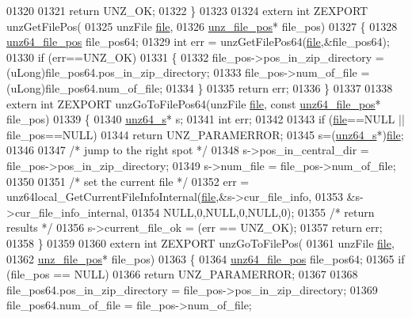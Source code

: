 \begin{DoxyCode}
01320 
01321     \textcolor{keywordflow}{return} UNZ\_OK;
01322 \}
01323 
01324 \textcolor{keyword}{extern} \textcolor{keywordtype}{int} ZEXPORT unzGetFilePos(
01325     unzFile \hyperlink{structfile}{file},
01326     \hyperlink{structunz__file__pos__s}{unz\_file\_pos}* file\_pos)
01327 \{
01328     \hyperlink{structunz64__file__pos__s}{unz64\_file\_pos} file\_pos64;
01329     \textcolor{keywordtype}{int} err = unzGetFilePos64(\hyperlink{structfile}{file},&file\_pos64);
01330     \textcolor{keywordflow}{if} (err==UNZ\_OK)
01331     \{
01332         file\_pos->pos\_in\_zip\_directory = (uLong)file\_pos64.pos\_in\_zip\_directory;
01333         file\_pos->num\_of\_file = (uLong)file\_pos64.num\_of\_file;
01334     \}
01335     \textcolor{keywordflow}{return} err;
01336 \}
01337 
01338 \textcolor{keyword}{extern} \textcolor{keywordtype}{int} ZEXPORT unzGoToFilePos64(unzFile \hyperlink{structfile}{file}, \textcolor{keyword}{const} \hyperlink{structunz64__file__pos__s}{unz64\_file\_pos}* file\_pos)
01339 \{
01340     \hyperlink{structunz64__s}{unz64\_s}* s;
01341     \textcolor{keywordtype}{int} err;
01342 
01343     \textcolor{keywordflow}{if} (\hyperlink{structfile}{file}==NULL || file\_pos==NULL)
01344         \textcolor{keywordflow}{return} UNZ\_PARAMERROR;
01345     s=(\hyperlink{structunz64__s}{unz64\_s}*)\hyperlink{structfile}{file};
01346 
01347     \textcolor{comment}{/* jump to the right spot */}
01348     s->pos\_in\_central\_dir = file\_pos->pos\_in\_zip\_directory;
01349     s->num\_file           = file\_pos->num\_of\_file;
01350 
01351     \textcolor{comment}{/* set the current file */}
01352     err = unz64local\_GetCurrentFileInfoInternal(\hyperlink{structfile}{file},&s->cur\_file\_info,
01353                                                &s->cur\_file\_info\_internal,
01354                                                NULL,0,NULL,0,NULL,0);
01355     \textcolor{comment}{/* return results */}
01356     s->current\_file\_ok = (err == UNZ\_OK);
01357     \textcolor{keywordflow}{return} err;
01358 \}
01359 
01360 \textcolor{keyword}{extern} \textcolor{keywordtype}{int} ZEXPORT unzGoToFilePos(
01361     unzFile \hyperlink{structfile}{file},
01362     \hyperlink{structunz__file__pos__s}{unz\_file\_pos}* file\_pos)
01363 \{
01364     \hyperlink{structunz64__file__pos__s}{unz64\_file\_pos} file\_pos64;
01365     \textcolor{keywordflow}{if} (file\_pos == NULL)
01366         \textcolor{keywordflow}{return} UNZ\_PARAMERROR;
01367 
01368     file\_pos64.pos\_in\_zip\_directory = file\_pos->pos\_in\_zip\_directory;
01369     file\_pos64.num\_of\_file = file\_pos->num\_of\_file;

\end{DoxyCode}
